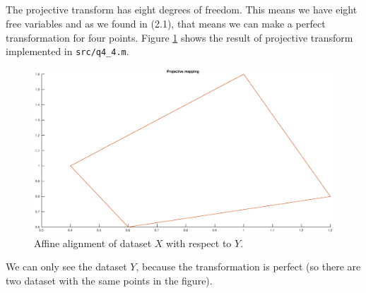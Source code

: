 \documentclass[a4paper]{article}
\begin{document}
\subsection{}
The projective transform has eight degrees of freedom. This means we have eight free variables and as we found in (2.1), that means we can make a perfect transformation for four points. Figure \ref{fig6} shows the result of projective transform implemented in \texttt{src/q4\_4.m}.
\begin{figure}[H]
  \centering
  \captionsetup{justification=centering}
  \includegraphics[width=\textwidth]{fig6.eps}
  \caption{Affine alignment of dataset $X$ with respect to $Y$.}
  \label{fig6}
\end{figure}
We can only see the dataset $Y$, because the transformation is perfect (so there are two dataset with the same points in the figure).
\end{document}
